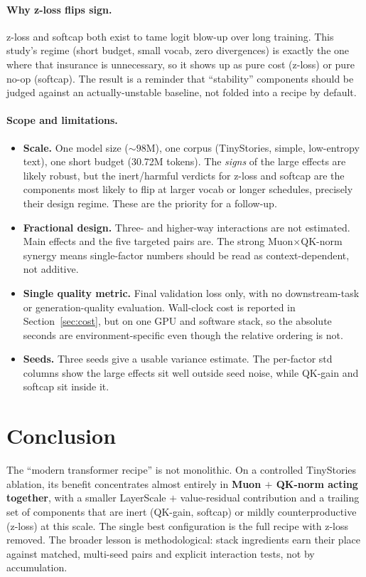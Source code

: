 \documentclass[11pt]{article}
\begin{document}
\paragraph{Why z-loss flips sign.} z-loss and softcap both exist to tame logit
blow-up over long training. This study's regime (short budget, small vocab, zero
divergences) is exactly the one where that insurance is unnecessary, so it shows
up as pure cost (z-loss) or pure no-op (softcap). The result is a reminder that
``stability'' components should be judged against an actually-unstable baseline,
not folded into a recipe by default.

\paragraph{Scope and limitations.}
\begin{itemize}
  \item \textbf{Scale.} One model size (${\sim}98$M), one corpus (TinyStories, simple, low-entropy text), one short budget (30.72M tokens). The \emph{signs} of the large effects are likely robust, but the inert/harmful verdicts for z-loss and softcap are the components most likely to flip at larger vocab or longer schedules, precisely their design regime. These are the priority for a follow-up.
  \item \textbf{Fractional design.} Three- and higher-way interactions are not estimated. Main effects and the five targeted pairs are. The strong Muon$\times$QK-norm synergy means single-factor numbers should be read as context-dependent, not additive.
  \item \textbf{Single quality metric.} Final validation loss only, with no downstream-task or generation-quality evaluation. Wall-clock cost is reported in Section~\ref{sec:cost}, but on one GPU and software stack, so the absolute seconds are environment-specific even though the relative ordering is not.
  \item \textbf{Seeds.} Three seeds give a usable variance estimate. The per-factor std columns show the large effects sit well outside seed noise, while QK-gain and softcap sit inside it.
\end{itemize}

\section{Conclusion}

The ``modern transformer recipe'' is not monolithic. On a controlled TinyStories
ablation, its benefit concentrates almost entirely in \textbf{Muon $+$ QK-norm
acting together}, with a smaller LayerScale $+$ value-residual contribution and a
trailing set of components that are inert (QK-gain, softcap) or mildly
counterproductive (z-loss) at this scale. The single best configuration is the
full recipe with z-loss removed. The broader lesson is methodological: stack
ingredients earn their place against matched, multi-seed pairs and explicit
interaction tests, not by accumulation.
\end{document}
